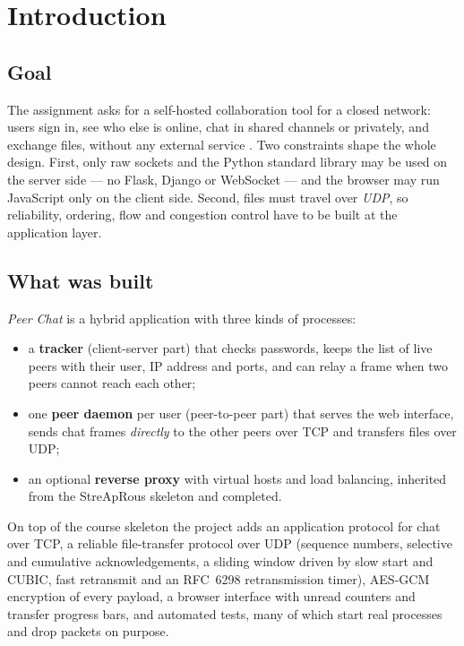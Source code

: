 \section{Introduction}\label{sec:intro}

\subsection{Goal}
The assignment asks for a self-hosted collaboration tool for a closed network: users sign in, see who
else is online, chat in shared channels or privately, and exchange files, without any external
service \cite{brief1,briefStreaprous}. Two constraints shape the whole design. First, only raw sockets
and the Python standard library may be used on the server side --- no Flask, Django or WebSocket ---
and the browser may run JavaScript only on the client side. Second, files must travel over
\emph{UDP}, so reliability, ordering, flow and congestion control have to be built at the
application layer.

\subsection{What was built}
\emph{Peer Chat} is a hybrid application with three kinds of processes:

\begin{itemize}
  \item a \textbf{tracker} (client-server part) that checks passwords, keeps the list of live peers
        with their user, IP address and ports, and can relay a frame when two peers cannot reach each
        other;
  \item one \textbf{peer daemon} per user (peer-to-peer part) that serves the web interface, sends
        chat frames \emph{directly} to the other peers over TCP and transfers files over UDP;
  \item an optional \textbf{reverse proxy} with virtual hosts and load balancing, inherited from the
        StreApRous skeleton and completed.
\end{itemize}

On top of the course skeleton the project adds an application protocol for chat over TCP, a reliable
file-transfer protocol over UDP (sequence numbers, selective and cumulative acknowledgements, a sliding
window driven by slow start and CUBIC, fast retransmit and an RFC~6298 retransmission timer),
AES-GCM encryption of every payload, a browser interface with unread counters and transfer progress
bars, and \FactTests{} automated tests, many of which start real processes and drop packets on purpose.

